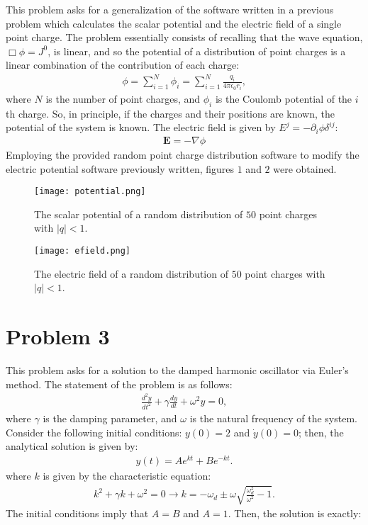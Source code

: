 \documentclass[letter,12pt]{article}
\begin{document}
This problem asks for a generalization of the software written in a previous problem which calculates the scalar potential and the electric field of a single point charge. The problem essentially consists of recalling that the wave equation, $\Box \phi = J^0$, is linear, and so the potential of a distribution of point charges is a linear combination of the contribution of each charge:
\begin{align}
\phi = \sum_{i=1}^N \phi_i = \sum_{i=1}^N \frac{q_i}{4\pi \epsilon_0 r_i},
\end{align}
where $N$ is the number of point charges, and $\phi_i$ is the Coulomb potential of the $i$th charge. So, in principle, if the charges and their positions are known, the potential of the system is known. The electric field is given by $E^j = -\partial_i \phi \delta^{ij}$:
\begin{align}
\mathbf{E} = -\nabla \phi
\end{align}
Employing the provided random point charge distribution software to modify the electric potential software previously written, figures $1$ and $2$ were obtained.

\begin{figure}[htbp]
    \centering
    \texttt{[image: potential.png]}
    \caption{The scalar potential of a random distribution of $50$ point charges with $|q|<1$.}
\end{figure}

\begin{figure}[htbp]
    \centering
    \texttt{[image: efield.png]}
    \caption{The electric field of a random distribution of $50$ point charges with $|q|<1$.}
\end{figure}

\section{Problem 3}

This problem asks for a solution to the damped harmonic oscillator via Euler's method. The statement of the problem is as follows:
\begin{align}
\frac{d^2 y}{dt^2} + \gamma \frac{dy}{dt} + \omega^2 y = 0,
\end{align}
where $\gamma$ is the damping parameter, and $\omega$ is the natural frequency of the system. Consider the following initial conditions: $y(0)=2$ and $\dot{y}(0) = 0$; then, the analytical solution is given by:
\begin{align}
y(t) = Ae^{kt}+Be^{-kt}.
\end{align}
where $k$ is given by the characteristic equation:
\begin{align}
k^2 + \gamma k + \omega^2 = 0 \to k = -\omega_d \pm \omega \sqrt{\frac{\omega_d^2}{\omega^2}-1}.
\end{align}
The initial conditions imply that $A=B$ and $A=1$. Then, the solution is exactly:
\begin{align}


\end{align}
\end{document}
